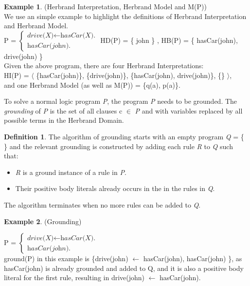 \documentclass[11pt,twoside]{report}
\theoremstyle{plain}
\theoremstyle{definition}
\newtheorem{defn}[thm]{Definition} %
\newtheorem{examp}{Example}[section]
\begin{document}
\begin{examp} \normalfont (Herbrand Interpretation, Herbrand Model and M(P)) \\
We use an simple example to highlight the definitions of Herbrand Interpretation and Herbrand Model.\\

P = $\begin{cases}
	\textit{drive(X)}  \leftarrow \textit{hasCar(X).} \\
	\textit{hasCar(john).}
      \end{cases}$ HD(P) = \{ john \} , HB(P) = \{ hasCar(john), drive(john) \}  \\

Given the above program, there are four Herbrand Interpretations:\\
HI(P) = $\langle$ \{hasCar(john)\}, \{drive(john)\}, \{hasCar(john), drive(john)\}, \{\} $\rangle$, \\
and one Herbrand Model (as well as M(P)) = \{q(a), p(a)\}.

\end{examp}
To solve a normal logic program \textit{P}, the program \textit{P} needs to be grounded. The \textit{grounding} of \textit{P} is the set of all clauses  c $\in$ \textit{P} and with variables replaced by all possible terms in the Herbrand Domain.
\begin{defn}
The algorithm of grounding starts with an empty program \textit{Q} = \{  \} and the relevant grounding is constructed by adding each rule \textit{R} to \textit{Q} such that:
\begin{itemize}
\item \textit{R} is a ground instance of a rule in \textit{P}.
\item Their positive body literals already occurs in the in the rules in \textit{Q}.
\end{itemize}
The algorithm terminates when no more rules can be added to \textit{Q}.
\end{defn}

\begin{examp} \normalfont (Grounding) \\
\label{grounding}

P = $\begin{cases}
	\textit{drive(X)}  \leftarrow \textit{hasCar(X).} \\
	\textit{hasCar(john).}
      \end{cases}$ \\

ground(P) in this example is \{drive(john) $\leftarrow$ hasCar(john), hasCar(john) \}, as hasCar(john) is already grounded and added to Q, 
and it is also a positive body literal for the first rule, resulting in drive(john) $\leftarrow$ hasCar(john).
\end{examp}
\end{document}
